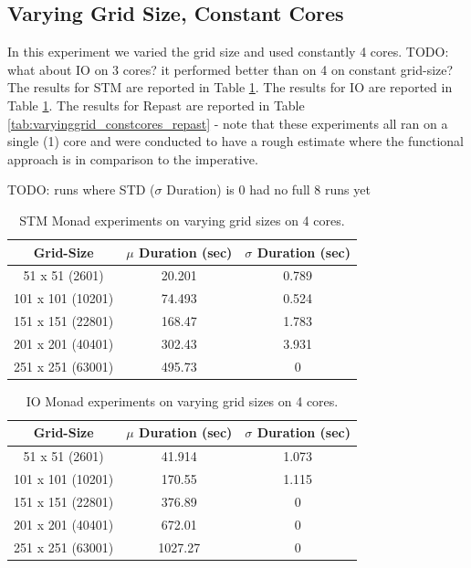 \subsection{Varying Grid Size, Constant Cores}
In this experiment we varied the grid size and used constantly 4 cores. TODO: what about IO on 3 cores? it performed better than on 4 on constant grid-size? The results for STM are reported in Table \ref{tab:varyinggrid_constcores_stm}. The results for IO are reported in Table \ref{tab:varyinggrid_constcores_stm}. The results for Repast are reported in Table \ref{tab:varyinggrid_constcores_repast} - note that these experiments all ran on a single (1) core and were conducted to have a rough estimate where the functional approach is in comparison to the imperative. 

TODO: runs where STD ($\sigma$ Duration) is 0 had no full 8 runs yet

\begin{table}
	\centering
  	\begin{tabular}{ c || c | c }
        Grid-Size         & $\mu$ Duration (sec) & $\sigma$ Duration (sec) \\ \hline \hline 
   		51 x 51 (2601)    & 20.201               & 0.789 \\ \hline
   		101 x 101 (10201) & 74.493               & 0.524 \\ \hline
   		151 x 151 (22801) & 168.47               & 1.783 \\ \hline
   		201 x 201 (40401) & 302.43               & 3.931 \\ \hline 
   		251 x 251 (63001) & 495.73               & 0 \\ \hline
  	\end{tabular}

  	\caption{STM Monad experiments on varying grid sizes on 4 cores.}
	\label{tab:varyinggrid_constcores_stm}
\end{table}


\begin{table}
	\centering
  	\begin{tabular}{ c || c | c }
        Grid-Size         & $\mu$ Duration (sec) & $\sigma$ Duration (sec) \\ \hline \hline 
   		51 x 51   (2601)  & 41.914 				 & 1.073 \\ \hline
   		101 x 101 (10201) & 170.55 				 & 1.115 \\ \hline
   		151 x 151 (22801) & 376.89 				 & 0 \\ \hline
   		201 x 201 (40401) & 672.01 				 & 0 \\ \hline 
   		251 x 251 (63001) & 1027.27				 & 0 \\ \hline 
  	\end{tabular}
  	
  	\caption{IO Monad experiments on varying grid sizes on 4 cores.}
	\label{tab:varyinggrid_constcores4_IO}
\end{table}

